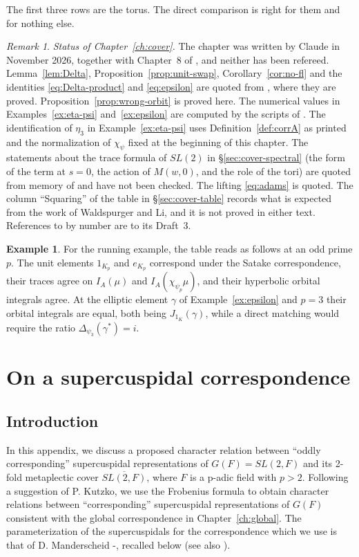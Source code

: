 \documentclass[12pt,letterpaper,openany]{book}
\theoremstyle{plain}
\theoremstyle{definition}
\newtheorem{example}[theorem]{Example}
\theoremstyle{remark}
\theoremstyle{remark}
\newtheorem{remyy}{Remark}
\begin{document}
\medskip
The first three rows are the torus. The direct comparison is right for
them and for nothing else.

\begin{remyy}\label{rem26:cover-status}
\emph{Status of Chapter~\ref{ch:cover}.} The chapter was written by
Claude in November 2026, together with Chapter~8 of \cite{JC}, and
neither has been refereed. Lemma~\ref{lem:Delta},
Proposition~\ref{prop:unit-swap}, Corollary~\ref{cor:no-fl} and the
identities \eqref{eq:Delta-product} and \eqref{eq:epsilon} are quoted
from \cite{JC}, where they are proved. Proposition~\ref{prop:wrong-orbit}
is proved here. The numerical values in Examples~\ref{ex:eta-psi}
and~\ref{ex:epsilon} are computed by the scripts of \cite{JC}. The
identification of $\eta_3$ in Example~\ref{ex:eta-psi} uses
Definition~\ref{def:corrA} as printed and the normalization of
$\chi_\psi$ fixed at the beginning of this chapter. The statements about
the trace formula of $SL(2)$ in \S\ref{sec:cover-spectral} (the form of
the term at $s=0$, the action of $M(w,0)$, and the role of the tori) are
quoted from memory of \cite{LL} and have not been checked. The lifting
\eqref{eq:adams} is quoted. The column ``Squaring'' of the table in
\S\ref{sec:cover-table} records what is expected from the work of
Waldspurger and Li, and it is not proved in either text. References to
\cite{JC} by number are to its Draft~3.
\end{remyy}

\begin{example}
For the running example, the table reads as follows at an odd prime $p$.
The unit elements $1_{K_p}$ and $e_{K_p}$ correspond under the Satake
correspondence, their traces agree on $I_A(\mu)$ and
$I_A(\chi_{\psi_p}\mu)$, and their hyperbolic orbital integrals agree. At
the elliptic element $\gamma$ of Example~\ref{ex:epsilon} and $p=3$
their orbital integrals are equal, both being $J_{1_K}(\gamma)$, while a
direct matching would require the ratio $\Delta_{\psi_3}(\gamma^*)=i$.
\end{example}

\appendix

\chapter{On a supercuspidal correspondence}\label{ch:sc}

\section{Introduction}
In this appendix, we discuss a proposed character relation between
``oddly corresponding'' supercuspidal
representations of $G(F)=SL(2,F)$ and its 2-fold metaplectic cover
$\overline{SL(2,F)}$, where $F$ is a p-adic field with $p>2$.
Following a suggestion of P. Kutzko, we use the Frobenius formula
to obtain character relations between ``corresponding'' supercuspidal
representations of $G(F)$ consistent with the global
correspondence in Chapter~\ref{ch:global}.
The parameterization of the supercuspidals for the correspondence
which we use is that of D. Manderscheid \cite{M1}-\cite{M2}, recalled
below (see also \cite{M3}).
\end{document}
